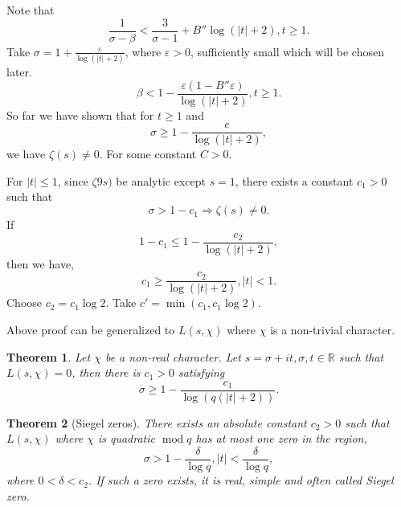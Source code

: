 \documentclass{article}
\newtheorem{theorem}{Theorem} [section]
\DeclareMathOperator{\tmod}{mod}
\newcommand{\R}[0]{\mathbb{R}}
\begin{document}
Note that
\begin{equation*}
  {\frac 1 {\sigma-\beta}}<{\frac 3 {\sigma-1}}+B''\log(\vert t\vert +2),t\geq1.
\end{equation*}
Take $\sigma = 1+{\frac {\varepsilon} {\log(\vert t\vert+2)}}$, where $\varepsilon>0$, sufficiently small which will be chosen later. 
\begin{equation*}
  \beta<1-{\frac {\varepsilon(1-B''\varepsilon)} {\log(\vert t\vert+2)}},t\geq1.
\end{equation*}
So far we have shown that  for $t\geq1$ and 
\begin{equation*}
  \sigma\geq 1-{\frac c {\log(\vert t\vert+2)}},
\end{equation*}
we have $\zeta(s)\not=0$. For some constant $C>0$. 
\par For $\vert t\vert\leq1$, since $\zeta9s)$ be analytic except $s=1$, there exists a constant $c_1>0$ such that 
\begin{equation*}
  \sigma>1-c_1\Rightarrow \zeta(s)\not=0.
\end{equation*}
If 
\begin{equation*}
  1-c_1\leq 1-{\frac {c_2} {\log(\vert t\vert+2)}},
\end{equation*}
then we have,
\begin{equation*}
  c_1\geq {\frac {c_2} {\log(\vert t\vert+2)}},\vert t\vert<1.
\end{equation*}
Choose $c_2=c_1\log2$. Take $c' = \min(c_1,c_1\log 2)$.
\par Above proof can be generalized to $L(s,\chi)$ where $\chi$ is a non-trivial character.
\begin{theorem}
  Let $\chi$ be a non-real character. Let $s=\sigma+it,\sigma,t\in\R$ such that $L(s,\chi)=0$, then there is $c_1>0$ satisfying
  \begin{equation*}
    \sigma\geq1-{\frac {c_1} {\log(q(\vert t\vert+2))}}.%
  \end{equation*}
  \label{theorem_non_trivial_zeros_lower_bound}
\end{theorem}
\begin{theorem}[Siegel zeros]
  There exists an absolute constant $c_2>0$ such that $L(s,\chi)$ where $\chi$ is quadratic $\tmod q$ has at most one zero in the region,
  \begin{equation*}
    \sigma>1-{\frac {\delta} {\log q}},\vert t\vert<{\frac {\delta} {\log q}},
  \end{equation*}
  where $0<\delta<c_2$.
  If such a zero exists, it is real, simple and often called Siegel zero.
\end{theorem}
\end{document}
